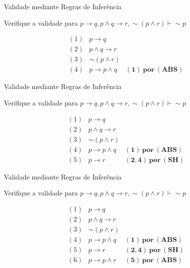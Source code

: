 \begin{frame}[t]{Validade mediante Regras de Inferência}

	Verifique a validade para $p \rightarrow q, p \wedge q \rightarrow r, \sim (p \wedge r) \vdash \sim p$
	
	\vskip 1.5cm
	
	$$\begin{array}{lll}
	(1) & p \rightarrow q  & \\
	(2) & p \wedge q \rightarrow r & \\
	(3) & \sim (p \wedge r) & \\
	\hline
	(4) & p \rightarrow p \wedge q & \mathbf{(1)~por~(ABS)}
	\end{array}$$	
\end{frame}


\begin{frame}[t]{Validade mediante Regras de Inferência}

	Verifique a validade para $p \rightarrow q, p \wedge q \rightarrow r, \sim (p \wedge r) \vdash \sim p$
	
	\vskip 1.5cm
	
	$$\begin{array}{lll}
	(1) & p \rightarrow q  & \\
	(2) & p \wedge q \rightarrow r & \\
	(3) & \sim (p \wedge r) & \\
	\hline
	(4) & p \rightarrow p \wedge q & \mathbf{(1)~por~(ABS)} \\
	(5) & p \rightarrow r & \mathbf{(2,4)~por~(SH)}
	\end{array}$$	
\end{frame}


\begin{frame}[t]{Validade mediante Regras de Inferência}

	Verifique a validade para $p \rightarrow q, p \wedge q \rightarrow r, \sim (p \wedge r) \vdash \sim p$
	
	\vskip 1.5cm
	
	$$\begin{array}{lll}
	(1) & p \rightarrow q  & \\
	(2) & p \wedge q \rightarrow r & \\
	(3) & \sim (p \wedge r) & \\
	\hline
	(4) & p \rightarrow p \wedge q & \mathbf{(1)~por~(ABS)} \\
	(5) & p \rightarrow r & \mathbf{(2,4)~por~(SH)} \\
	(6) & p \rightarrow p \wedge r & \mathbf{(5)~por~(ABS)}
	\end{array}$$	
\end{frame}


